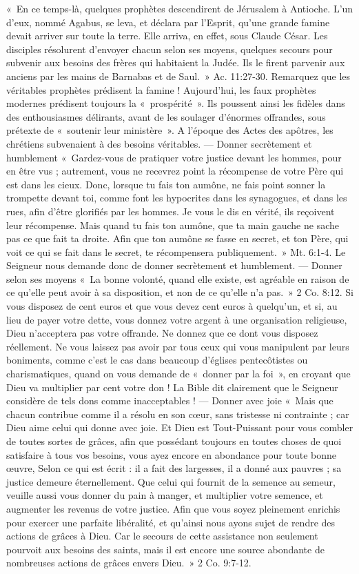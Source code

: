 \begin{multicols}{2}
{«~En ce temps-là, quelques prophètes descendirent de Jérusalem à Antioche. L’un d'eux, nommé Agabus, se leva, et déclara par l'Esprit, qu'une grande famine devait arriver sur toute la terre. Elle arriva, en effet, sous Claude César. 
Les disciples résolurent d’envoyer chacun selon ses moyens, quelques secours pour subvenir aux besoins des frères qui habitaient la Judée. Ils le firent parvenir aux anciens par les mains de Barnabas et de Saul.~» Ac. 11:27-30. Remarquez que les véritables prophètes prédisent la famine ! Aujourd’hui, les faux prophètes modernes prédisent toujours la «~prospérité~». Ils poussent ainsi les fidèles dans des enthousiasmes délirants, avant de les soulager d’énormes 
offrandes, sous prétexte de «~soutenir leur ministère~». A l’époque des Actes des apôtres, les chrétiens subvenaient à des besoins véritables.
— Donner secrètement et humblement
«~Gardez-vous de pratiquer votre justice devant les hommes, pour en être vus ; autrement, vous ne recevrez point la récompense de votre Père qui est dans les cieux. Donc, lorsque tu fais ton aumône, ne fais point sonner la trompette 
devant toi, comme font les hypocrites dans les synagogues, et dans les rues, afin d’être glorifiés par les hommes. Je vous le dis en vérité, ils reçoivent leur récompense. Mais quand tu fais ton aumône, que ta main gauche ne sache pas ce que fait ta droite. Afin que ton aumône se fasse en secret, et ton Père, qui voit ce qui se fait dans le secret, te récompensera publiquement.~» Mt. 6:1-4.
Le Seigneur nous demande donc de donner secrètement et humblement.
— Donner selon ses moyens
«~La bonne volonté, quand elle existe, est agréable en raison de ce qu’elle peut avoir à sa disposition, et non de ce qu’elle n’a pas.~» 2 Co. 8:12.
Si vous disposez de cent euros et que vous devez cent euros à quelqu’un, et si, au lieu de payer votre dette, vous donnez votre argent à une organisation religieuse, Dieu n’acceptera pas votre offrande. Ne donnez que ce dont vous disposez réellement. Ne vous laissez pas avoir par tous ceux qui vous manipulent par leurs boniments, comme c’est le cas dans beaucoup d’églises pentecôtistes ou charismatiques, quand on vous demande de «~donner par la foi~», en croyant que Dieu va multiplier par cent votre don ! La Bible dit clairement que le Seigneur considère de tels dons comme inacceptables !
— Donner avec joie
«~Mais que chacun contribue comme il a résolu en son cœur, sans tristesse ni contrainte ; car Dieu aime celui qui donne avec joie. Et Dieu est Tout-Puissant pour vous combler de toutes sortes de grâces, afin que possédant toujours en toutes choses de quoi satisfaire à tous vos besoins, vous ayez encore en abondance pour toute bonne œuvre, Selon ce qui est écrit : il a fait des largesses, il a donné aux pauvres ; sa justice demeure éternellement. Que celui qui fournit de la semence au semeur, veuille aussi vous donner du pain à manger, et multiplier votre semence, et augmenter les revenus de votre justice. Afin que vous soyez pleinement enrichis pour exercer une parfaite libéralité, et qu’ainsi nous ayons sujet de rendre des actions de grâces à Dieu. Car le secours de cette assistance non seulement pourvoit aux besoins des saints, mais il est encore une source abondante de nombreuses actions de grâces envers Dieu.~» 2 Co. 9:7-12.
}
\end{multicols}
